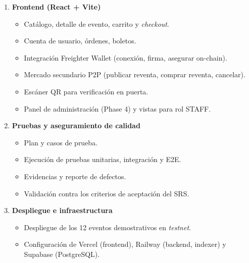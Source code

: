 \documentclass[12pt,oneside]{report}
\begin{document}
\begin{enumerate}[label=\textbf{1.\arabic*},leftmargin=*]
          \begin{itemize}[label=$\circ$]
            \item API REST: catálogo, autenticación (bcrypt+JWT), carrito, \textit{checkout}, órdenes, boletos.
            \item Constructor de XDR \textit{stateless} (XDR proxy).
            \item Indexer Soroban (polling cada 5 s) y sincronización a PostgreSQL.
            \item Esquema Prisma y migraciones versionadas.
            \item Documentación de endpoints.
          \end{itemize}
        \item \textbf{Frontend (React + Vite)}
          \begin{itemize}[label=$\circ$]
            \item Catálogo, detalle de evento, carrito y \textit{checkout}.
            \item Cuenta de usuario, órdenes, boletos.
            \item Integración Freighter Wallet (conexión, firma, asegurar on-chain).
            \item Mercado secundario P2P (publicar reventa, comprar reventa, cancelar).
            \item Escáner QR para verificación en puerta.
            \item Panel de administración (Phase 4) y vistas para rol STAFF.
          \end{itemize}
        \item \textbf{Pruebas y aseguramiento de calidad}
          \begin{itemize}[label=$\circ$]
            \item Plan y casos de prueba.
            \item Ejecución de pruebas unitarias, integración y E2E.
            \item Evidencias y reporte de defectos.
            \item Validación contra los criterios de aceptación del SRS.
          \end{itemize}
        \item \textbf{Despliegue e infraestructura}
          \begin{itemize}[label=$\circ$]
            \item Despliegue de los 12 eventos demostrativos en \textit{testnet}.
            \item Configuración de Vercel (frontend), Railway (backend, indexer) y Supabase (PostgreSQL).

\end{itemize}
\end{enumerate}
\end{document}
